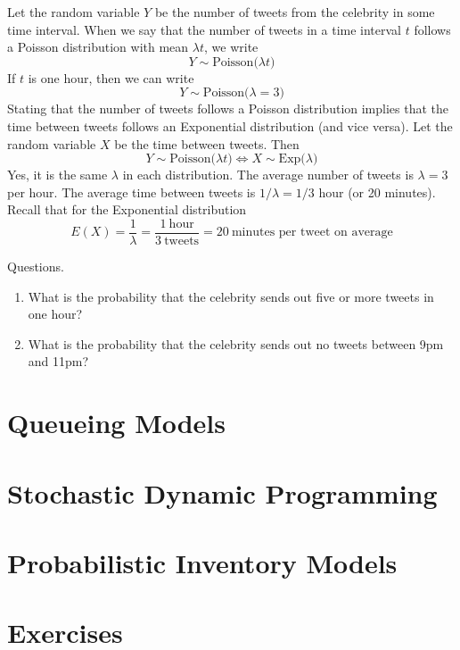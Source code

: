 Let the random variable $Y$ be the number of tweets from
the celebrity in some time interval.
When we say that the number of tweets in a time interval $t$ follows
a Poisson distribution with mean $\lambda t$, we write
\[
  Y \sim \text{Poisson($\lambda t$)}
\]
If $t$ is one hour, then we can write
\[
  Y \sim \text{Poisson($\lambda = 3$)}
\]
Stating that the number of tweets follows a Poisson distribution
implies that the time between tweets follows an Exponential
distribution (and vice versa). Let the random variable $X$ be
the time between tweets. Then
\[
  Y \sim \text{Poisson($\lambda t$)} \Longleftrightarrow X \sim \text{Exp($\lambda$)}
\]
Yes, it is the same $\lambda$ in each distribution.
The average number of tweets is $\lambda=3$ per hour. The average
time between tweets is $1/\lambda = 1/3$ hour (or 20 minutes).
Recall that for the Exponential distribution
\[
  E(X) = \frac{1}{\lambda} = \frac{1~\text{hour}}{3~\text{tweets}} = 20 ~\text{minutes per tweet on average}
\]

Questions.
\begin{enumerate}
\item What is the probability that the celebrity sends out five or
  more tweets in one hour?
\item What is the probability that the celebrity sends out
  no tweets between 9pm and 11pm?
\end{enumerate}

\section{Queueing Models}

\section{Stochastic Dynamic Programming}

\section{Probabilistic Inventory Models}

\section{Exercises}

